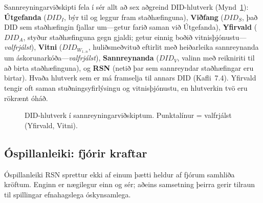 \documentclass[11pt,a4paper,twocolumn]{article}
\begin{document}
Sannreyningarviðskipti fela í sér allt að sex aðgreind DID-hlutverk (Mynd~\ref{fig:roles}): \textbf{Útgefanda} ($DID_I$, býr til og leggur fram staðhæfinguna), \textbf{Viðfang} ($DID_S$, það DID sem staðhæfingin fjallar um---getur farið saman við Útgefanda), \textbf{Yfirvald} ($DID_A$, styður staðhæfinguna gegn gjaldi; getur einnig boðið vitnisþjónustu---\emph{valfrjálst}), \textbf{Vitni} ($DID_{W_{1..n}}$, huliðsmeðvituð eftirlit með heiðarleika sannreynanda um áskorunarkóða---\emph{valfrjálst}), \textbf{Sannreynanda} ($DID_V$, valinn með reikniriti til að birta staðhæfinguna), og \textbf{RSN} (netið þar sem sannreyndar staðhæfingar eru birtar). Hvaða hlutverk sem er má framselja til annars DID (Kafli~7.4). Yfirvald tengir oft saman stuðningsyfirlýsingu og vitnisþjónustu, en hlutverkin tvö eru rökrænt óháð.

\begin{figure}[ht]
\centering
{}
\caption{DID-hlutverk í sannreyningarviðskiptum. Punktalínur = valfrjálst (Yfirvald, Vitni).}
\label{fig:roles}
\end{figure}

\subsection{Óspillanleiki: fjórir kraftar}

Óspillanleiki RSN sprettur ekki af einum þætti heldur af fjórum samhliða kröftum. Enginn er nægilegur einn og sér; aðeins samsetning þeirra gerir tilraun til spillingar efnahagslega óskynsamlega.
\end{document}
